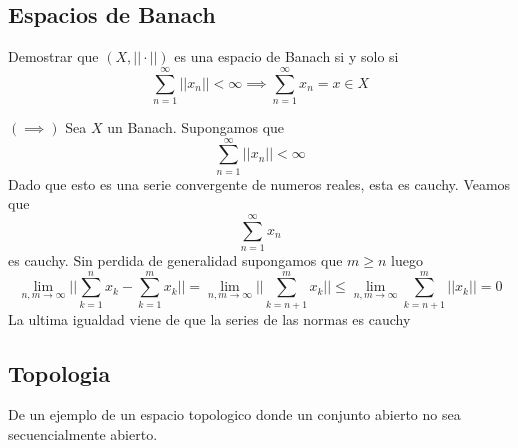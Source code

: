 \documentclass[../main.tex]{subfiles}
\begin{document}
\subsection{Espacios de Banach}
\begin{problem}
  Demostrar que $(X, ||\cdot||)$ es una espacio de Banach si y solo si
  \begin{equation*}
    \sum_{n = 1}^{\infty} ||x_{n}|| < \infty \implies \sum_{n = 1}^{\infty} x_{n} = x \in X
  \end{equation*}
\end{problem}
\begin{solution}
  $(\implies)$ Sea $X$ un Banach. Supongamos que
  \begin{equation*}
    \sum_{n = 1}^{\infty} ||x_{n}|| < \infty
  \end{equation*}
  Dado que esto es una serie convergente de numeros reales, esta es cauchy. Veamos que
  \begin{equation*}
    \sum_{n = 1}^{\infty} x_{n}
  \end{equation*}
  es cauchy.
  Sin perdida de generalidad supongamos que $m \geq n$ luego
  \begin{equation*}
    \lim_{n,m \to \infty} ||\sum_{k = 1}^{n} x_{k} - \sum_{k=1}^m x_{k}|| = \lim_{n,m \to \infty} ||\sum_{k = n + 1}^{m} x_{k}|| \leq \lim_{n, m \to \infty} \sum_{k = n + 1}^{m} ||x_{k}|| = 0
  \end{equation*}
  La ultima igualdad viene de que la series de las normas es cauchy
\end{solution}

\subsection{Topologia}
\begin{problem}
  De un ejemplo de un espacio topologico donde un conjunto abierto no sea secuencialmente abierto.
\end{problem}
\begin{solution}
\end{solution}
\end{document}
